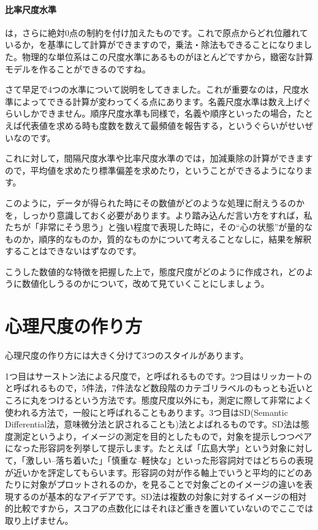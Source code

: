 \documentclass{ltjsbook}
\begin{document}
\paragraph{比率尺度水準}  は，さらに絶対0点の制約を付け加えたものです。これで原点からどれ位離れているか，を基準にして計算ができますので，乗法・除法もできることになりました。物理的な単位系はこの尺度水準にあるものがほとんどですから，緻密な計算モデルを作ることができるのですね。

さて早足で4つの水準について説明をしてきました。これが重要なのは，尺度水準によってできる計算が変わってくる点にあります。名義尺度水準は数え上げぐらいしかできません。順序尺度水準も同様で，名義や順序といったの場合，たとえば代表値を求める時も度数を数えて最頻値を報告する，というぐらいがせいぜいなのです。

これに対して，間隔尺度水準や比率尺度水準のでは，加減乗除の計算ができますので，平均値を求めたり標準偏差を求めたり，ということができるようになります。

このように，データが得られた時にその数値がどのような処理に耐えうるのかを，しっかり意識しておく必要があります。より踏み込んだ言い方をすれば，私たちが「非常にそう思う」と強い程度で表現した時に，その``心の状態''が量的なものか，順序的なものか，質的なものかについて考えることなしに，結果を解釈することはできないはずなのです。

こうした数値的な特徴を把握した上で，態度尺度がどのように作成され，どのように数値化しうるのかについて，改めて見ていくことにしましょう。


\section{心理尺度の作り方}
心理尺度の作り方には大きく分けて3つのスタイルがあります。

1つ目はサーストン法による尺度で，と呼ばれるものです。2つ目はリッカートのと呼ばれるもので，5件法，7件法など数段階のカテゴリラベルのもっとも近いところに丸をつけるという方法です。態度尺度以外にも，測定に際して非常によく使われる方法で，一般にと呼ばれることもあります。3つ目はSD(Semantic Differential法，意味微分法と訳されることも)法とよばれるものです。SD法は態度測定というより，イメージの測定を目的としたもので，対象を提示しつつペアになった形容詞を列挙して提示します。たとえば「広島大学」という対象に対して，「激しい--落ち着いた」「慎重な--軽快な」といった形容詞対ではどちらの表現が近いかを評定してもらいます。形容詞の対が作る軸上でいうと平均的にどのあたりに対象がプロットされるのか，を見ることで対象ごとのイメージの違いを表現するのが基本的なアイデアです。SD法は複数の対象に対するイメージの相対的比較ですから，スコアの点数化にはそれほど重きを置いていないのでここでは取り上げません。
\end{document}

